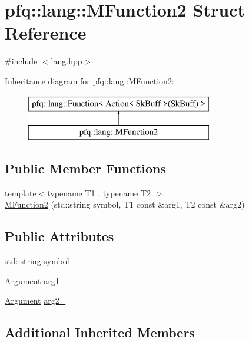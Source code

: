 \hypertarget{structpfq_1_1lang_1_1MFunction2}{\section{pfq\+:\+:lang\+:\+:M\+Function2 Struct Reference}
\label{structpfq_1_1lang_1_1MFunction2}
}


{\ttfamily \#include $<$lang.\+hpp$>$}

Inheritance diagram for pfq\+:\+:lang\+:\+:M\+Function2\+:\begin{figure}[H]
\begin{center}
\leavevmode
\includegraphics[height=2.000000cm]{structpfq_1_1lang_1_1MFunction2}
\end{center}
\end{figure}
\subsection*{Public Member Functions}
\begin{DoxyCompactItemize}
\item 
{\footnotesize template$<$typename T1 , typename T2 $>$ }\\\hyperlink{structpfq_1_1lang_1_1MFunction2_ace1b84e90e4d64d527569c710e49a743}{M\+Function2} (std\+::string symbol, T1 const \&arg1, T2 const \&arg2)
\end{DoxyCompactItemize}
\subsection*{Public Attributes}
\begin{DoxyCompactItemize}
\item 
std\+::string \hyperlink{structpfq_1_1lang_1_1MFunction2_afdd71c7aed6b8f5f801bfd6c98f7274d}{symbol\+\_\+}
\item 
\hyperlink{structpfq_1_1lang_1_1Argument}{Argument} \hyperlink{structpfq_1_1lang_1_1MFunction2_a0093c5b459cb597f34588894f5105e6b}{arg1\+\_\+}
\item 
\hyperlink{structpfq_1_1lang_1_1Argument}{Argument} \hyperlink{structpfq_1_1lang_1_1MFunction2_a5f2a3278cdc59b6560ea02e7f9ead5ab}{arg2\+\_\+}
\end{DoxyCompactItemize}
\subsection*{Additional Inherited Members}


